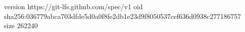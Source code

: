 version https://git-lfs.github.com/spec/v1
oid sha256:036779abca703dfde5d0a0f8fe2db1e23d9f8050537cef636d0938c277186757
size 262240

